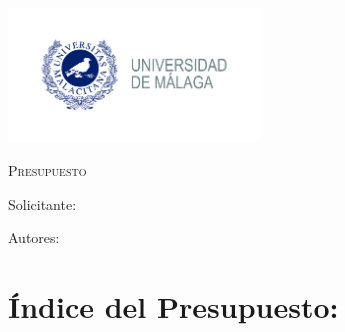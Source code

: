 \documentclass[../main.tex]{subfiles}
\begin{document}
\newpage
\thispagestyle{empty}
\begin{center}
    \centering
    {\includegraphics[width=0.5\textwidth]{Imagenes/Logo UMA.jpg}\par}
    \vspace{1cm}
    {\bfseries\LARGE \Facultad \par}
    \vspace{0.5cm}
    {\scshape\Large \Grado \par}
    \vspace{3cm}
    {\scshape\Huge Presupuesto \par}
    \vspace{1.5cm}
    {\itshape\Large \TituloProyecto \par}
    \vfill
    {\Large Solicitante: \par}
    {\Large \Solicitante  \par}
    \vspace{1cm}
    {\Large Autores: \par}
    {\Large \Autora \par}
    {\Large \Autor \par}
    \vfill
    {\Large \Fecha \par}
\end{center}


\chapter*{Índice del Presupuesto:}
\newpage
{}

\end{document}
